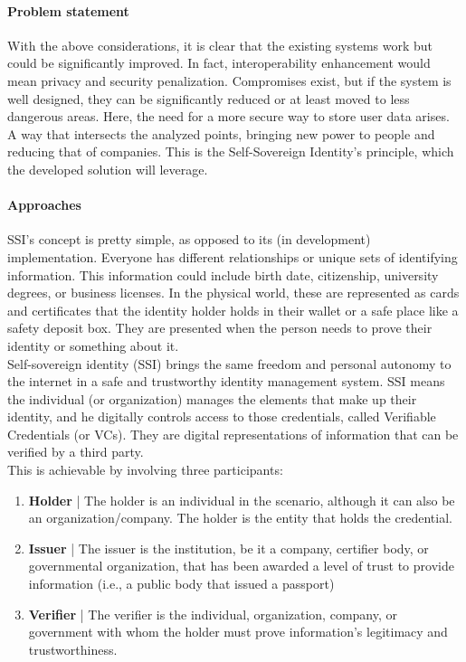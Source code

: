 \paragraph{Problem statement}
With the above considerations, it is clear that the existing systems work 
but could be significantly improved. In fact, interoperability enhancement 
would mean privacy and security penalization. Compromises exist, but if the 
system is well designed, they can be significantly reduced or at least 
moved to less dangerous areas. Here, the need for a more secure way to store
user data arises. A way that intersects the analyzed points, bringing new 
power to people and reducing that of companies. This is the Self-Sovereign 
Identity's principle, which the developed solution will leverage.

\paragraph{Approaches} SSI's concept is pretty simple, as opposed to its 
(in development) implementation. Everyone has different relationships or 
unique sets of identifying information. This information could include 
birth date, citizenship, university degrees, or business licenses. In the 
physical world, these are represented as cards and certificates that the 
identity holder holds in their wallet or a safe place like a safety deposit 
box. They are presented when the person needs to prove their identity or 
something about it.\\
Self-sovereign identity (SSI) brings the same freedom and personal autonomy
to the internet in a safe and trustworthy identity management system. 
SSI means the individual (or organization) manages the elements that make 
up their identity, and he digitally controls access to those credentials,
called Verifiable Credentials (or VCs). They are digital representations of
information that can be verified by a third party.
\vspace*{1.2cm}\\
This is achievable by involving three participants:
\begin{enumerate}
    \item \textbf{Holder} | The holder is an individual in the scenario, 
    although it can also be an organization/company. The holder is the 
    entity that holds the credential.
    \item \textbf{Issuer} | The issuer is the institution, be it a company, 
    certifier body, or governmental organization, that has been awarded a 
    level of trust to provide information (i.e., a public body that issued 
    a passport)
    \item \textbf{Verifier} | The verifier is the individual, organization,
    company, or government with whom the holder must prove information's 
    legitimacy and trustworthiness.
\end{enumerate}

